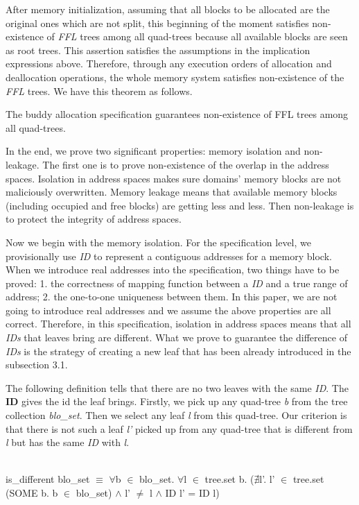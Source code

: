 After memory initialization, assuming that all blocks to be allocated are the original ones which are not split, this beginning of the moment satisfies non-existence of \emph{FFL} trees among all quad-trees because all available blocks are seen as root trees. This assertion satisfies the assumptions in the implication expressions above. Therefore, through any execution orders of allocation and deallocation operations, the whole memory system satisfies non-existence of the \emph{FFL} trees. We have this theorem as follows.

\begin{theorem}
The buddy allocation specification guarantees non-existence of FFL trees among all quad-trees.
\end{theorem}

In the end, we prove two significant properties: memory isolation and non-leakage. The first one is to prove non-existence of the overlap in the address spaces. Isolation in address spaces makes sure domains' memory blocks are not maliciously overwritten. Memory leakage means that available memory blocks (including occupied and free blocks) are getting less and less. Then non-leakage is to protect the integrity of address spaces.

Now we begin with the memory isolation. For the specification level, we provisionally use \emph{ID} to represent a contiguous addresses for a memory block. When we introduce real addresses into the specification, two things have to be proved: 1. the correctness of mapping function between a \emph{ID} and a true range of address; 2. the one-to-one uniqueness between them. In this paper, we are not going to introduce real addresses and we assume the above properties are all correct. Therefore, in this specification, isolation in address spaces means that all \emph{IDs} that leaves bring are different. What we prove to guarantee the difference of \emph{IDs} is the strategy of creating a new leaf that has been already introduced in the subsection 3.1.

The following definition tells that there are no two leaves with the same \emph{ID}. The \textbf{ID} gives the id the leaf brings. Firstly, we pick up any quad-tree \emph{b} from the tree collection \emph{blo\_set}. Then we select any leaf \emph{l} from this quad-tree. Our criterion is that there is not such a leaf \emph{l'} picked up from any quad-tree that is different from \emph{l} but has the same \emph{ID} with \emph{l}.

\begin{definition}  \\
is\_different blo\_set $\equiv$ $\forall$b $\in$ blo\_set. $\forall$l $\in$ tree.set b. ($\nexists$l'. l' $\in$ tree.set (SOME b. b $\in$ blo\_set) $\wedge$ l' $\ne$ l $\wedge$ ID l' = ID l)
\end{definition}

